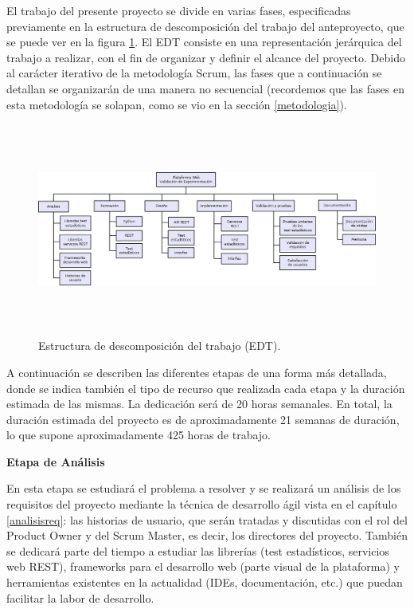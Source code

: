 El trabajo del presente proyecto se divide en varias fases, especificadas previamente en la estructura de descomposición del trabajo del anteproyecto, que se puede ver en la figura \ref{fig:edt}. El EDT consiste en una representación jerárquica del trabajo a realizar, con el fin de organizar y definir el alcance del proyecto. Debido al carácter iterativo de la metodología Scrum, las fases que a continuación se detallan se organizarán de una manera no secuencial (recordemos que las fases en esta metodología se solapan, como se vio en la sección \ref{metodologia}).

\begin{figure}[H]
\centering
\includegraphics[width=14cm,height=7cm]{figuras/edt.png}
\caption{Estructura de descomposición del trabajo (EDT).}
\label{fig:edt}
\end{figure}

A continuación se describen las diferentes etapas de una forma más detallada, donde se indica también el tipo de recurso que realizada cada etapa y la duración estimada de las mismas. La dedicación será de 20 horas semanales. En total, la duración estimada del proyecto es de aproximadamente 21 semanas de duración, lo que supone aproximadamente 425 horas de trabajo.

\noindent
\textbf{Etapa de Análisis}

En esta etapa se estudiará el problema a resolver y se realizará un análisis de los requisitos del proyecto mediante la técnica de desarrollo ágil vista en el capítulo \ref{analisisreq}: las historias de usuario, que serán tratadas y discutidas con el rol del Product Owner y del Scrum Master, es decir, los directores del proyecto. También se dedicará parte del tiempo a estudiar las librerías (test estadísticos, servicios web REST), frameworks para el desarrollo web (parte visual de la plataforma) y herramientas existentes en la actualidad (IDEs, documentación, etc.) que puedan facilitar la labor de desarrollo.

